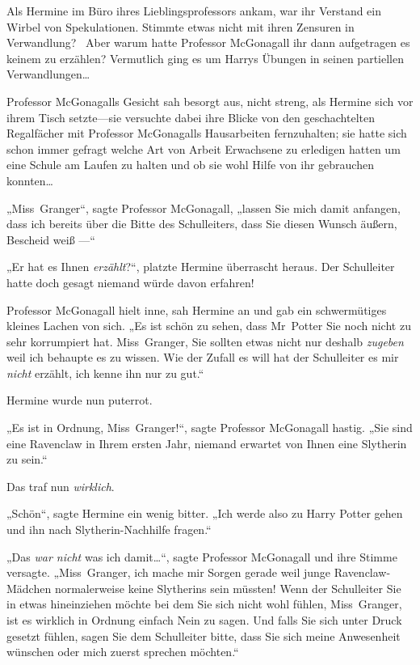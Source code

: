 {Als Hermine im Büro ihres Lieblingsprofessors ankam, war ihr Verstand ein Wirbel von Spekulationen. Stimmte etwas nicht mit ihren Zensuren in Verwandlung? ~Aber warum hatte Professor McGonagall ihr dann aufgetragen es keinem zu erzählen? Vermutlich ging es um Harrys Übungen in seinen partiellen Verwandlungen…

Professor McGonagalls Gesicht sah besorgt aus, nicht streng, als Hermine sich vor ihrem Tisch setzte—sie versuchte dabei ihre Blicke von den geschachtelten Regalfächer mit Professor McGonagalls Hausarbeiten fernzuhalten; sie hatte sich schon immer gefragt welche Art von Arbeit Erwachsene zu erledigen hatten um eine Schule am Laufen zu halten und ob sie wohl Hilfe von ihr gebrauchen konnten…

„Miss~Granger“, sagte Professor McGonagall, „lassen Sie mich damit anfangen, dass ich bereits über die Bitte des Schulleiters, dass Sie diesen Wunsch äußern, Bescheid weiß —“

„Er hat es Ihnen \emph{erzählt}?“, platzte Hermine überrascht heraus. Der Schulleiter hatte doch gesagt niemand würde davon erfahren!

Professor McGonagall hielt inne, sah Hermine an und gab ein schwermütiges kleines Lachen von sich. „Es ist schön zu sehen, dass Mr~Potter Sie noch nicht zu sehr korrumpiert hat. Miss~Granger, Sie sollten etwas nicht nur deshalb \emph{zugeben} weil ich behaupte es zu wissen. Wie der Zufall es will hat der Schulleiter es mir \emph{nicht} erzählt, ich kenne ihn nur zu gut.“

Hermine wurde nun puterrot.

„Es ist in Ordnung, Miss~Granger!“, sagte Professor McGonagall hastig. „Sie sind eine Ravenclaw in Ihrem ersten Jahr, niemand erwartet von Ihnen eine Slytherin zu sein.“

Das traf nun \emph{wirklich}.

„Schön“, sagte Hermine ein wenig bitter. „Ich werde also zu Harry Potter gehen und ihn nach Slytherin-Nachhilfe fragen.“

„Das \emph{war nicht} was ich damit…“, sagte Professor McGonagall und ihre Stimme versagte. „Miss~Granger, ich mache mir Sorgen gerade weil junge Ravenclaw-Mädchen normalerweise keine Slytherins sein müssten! Wenn der Schulleiter Sie in etwas hineinziehen möchte bei dem Sie sich nicht wohl fühlen, Miss~Granger, ist es wirklich in Ordnung einfach Nein zu sagen. Und falls Sie sich unter Druck gesetzt fühlen, sagen Sie dem Schulleiter bitte, dass Sie sich meine Anwesenheit wünschen oder mich zuerst sprechen möchten.“

}
